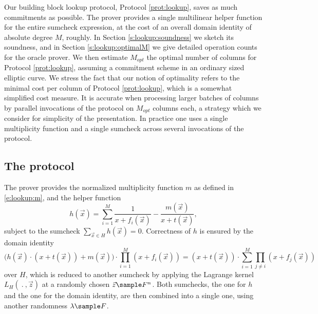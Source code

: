 \documentclass[11pt]{article}
\theoremstyle{definition}
\theoremstyle{definition}
\begin{document}
Our building block lookup protocol, Protocol \ref{prot:lookup}, saves as much commitments as possible.
The prover provides a single multilinear helper function for the entire sumcheck expression, at the cost of an overall domain identity of absolute degree $M$, roughly. 
In Section \ref{s:lookup:soundness} we sketch its soundness, and in Section \ref{s:lookup:optimalM} we give detailed operation counts for the oracle prover. 
We then estimate  $M_{opt}$ the optimal number of columns for Protocol \ref{prot:lookup}, assuming a commitment scheme in an ordinary sized elliptic curve\footnotemark.
We stress the fact that our notion of optimality refers to the minimal cost per column of Protocol \ref{prot:lookup}, which is a somewhat simplified cost measure.
It is accurate when processing larger batches of columns by parallel invocations of the protocol on $M_{opt}$ columns each, a strategy which we consider for simplicity of the presentation.
In practice one uses a single multiplicity function and a single sumcheck across several invocations of the protocol. 


\subsection{The protocol}
\label{s:lookup:small}

The prover provides the normalized multiplicity function $m$ as defined in \eqref{e:lookup:m}, and the helper function
\begin{equation}
\label{e:lookup:h}
h(\vec x) = \sum_{i=1}^M \frac{1}{x + f_i(\vec x)} - \frac{m(\vec x)}{x + t(\vec x)},
\end{equation}
subject to the sumcheck $\sum_{\vec x\in H} h(\vec x) = 0$.
Correctness of $h$ is ensured by the domain identity
\begin{equation}
\label{e:lookup:h:identity}
\big(h(\vec x) \cdot  (x + t(\vec x)) + m(\vec x)\big) \cdot \prod_{i=1}^M (x + f_i(\vec x)) = (x + t(\vec x))\cdot \sum_{i=1}^M \prod_{j\neq i} (x + f_j(\vec x))
\end{equation}
over $H$, which is reduced to another sumcheck by applying the Lagrange kernel $L_H(\:.\:, \vec z)$ at a randomly chosen $\vec z\sample F^n$.
Both sumchecks, the one for $h$ and the one for the domain identity, are then combined into a single one, using another randomness $\lambda\sample F$.
\end{document}
